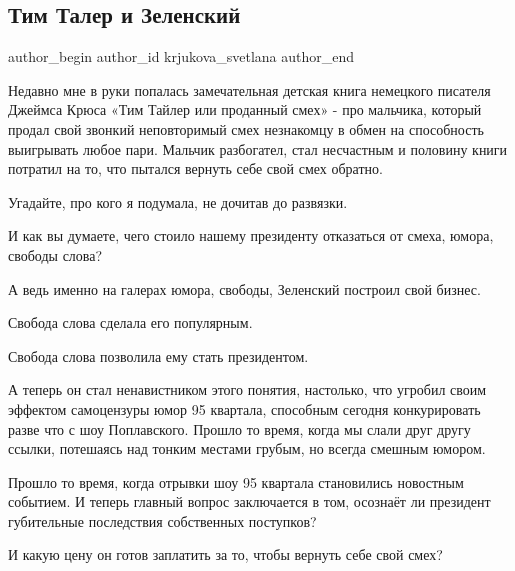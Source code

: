  
 
 
 
 
 
\subsection{Тим Талер и Зеленский}
\label{sec:15_11_2021.fb.krjukova_svetlana.1.tim_taler_zelenskii}
 
\ifcmt
 author_begin
   author_id krjukova_svetlana
 author_end
\fi

Недавно мне в руки попалась замечательная детская книга немецкого писателя
Джеймса Крюса «Тим Тайлер или проданный смех» - про мальчика, который продал
свой звонкий неповторимый смех незнакомцу в обмен на способность выигрывать
любое пари. Мальчик разбогател, стал несчастным и половину книги потратил на
то, что пытался вернуть себе свой смех обратно.

Угадайте, про кого я подумала, не дочитав до развязки. 

И как вы думаете, чего стоило нашему президенту отказаться от смеха, юмора,
свободы слова?

А ведь именно на галерах юмора, свободы, Зеленский построил свой бизнес.

Свобода слова сделала его популярным. 

Свобода слова позволила ему стать президентом.

А теперь он стал ненавистником этого понятия, настолько, что угробил своим
эффектом самоцензуры юмор 95 квартала, способным сегодня конкурировать разве
что с шоу Поплавского. Прошло то время, когда мы слали друг другу ссылки,
потешаясь над тонким местами грубым, но всегда смешным юмором.

Прошло то время, когда отрывки шоу 95 квартала становились новостным событием.
И теперь главный вопрос заключается в том, осознаёт ли президент губительные
последствия собственных поступков? 

И какую цену он готов заплатить за то, чтобы вернуть себе свой смех?

